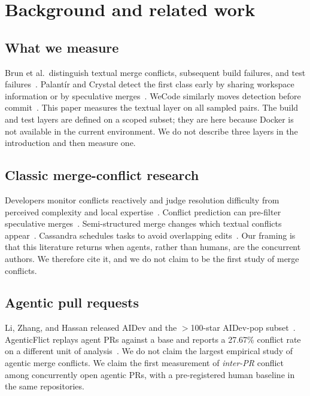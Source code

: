 \documentclass[10pt,conference]{IEEEtran}
\begin{document}
\section{Background and related work}
\label{sec:related}

\subsection{What we measure}
Brun et al.\ distinguish textual merge conflicts, subsequent build failures, and test failures~\cite{brun2013crystal}. Palant\'ir and Crystal detect the first class early by sharing workspace information or by speculative merges~\cite{sarma2003palantir,sarma2012palantir,brun2011proactive,brun2010speculative}. WeCode similarly moves detection before commit~\cite{guimaraes2012wecode}. This paper measures the textual layer on all sampled pairs. The build and test layers are defined on a scoped subset; they are \WPFiveStatus{} here because Docker is not available in the current environment. We do not describe three layers in the introduction and then measure one.

\subsection{Classic merge-conflict research}
Developers monitor conflicts reactively and judge resolution difficulty from perceived complexity and local expertise~\cite{nelson2019lifecycle,mckee2017perspectives}. Conflict prediction can pre-filter speculative merges~\cite{owhadi2019predicting}. Semi-structured merge changes which textual conflicts appear~\cite{apel2011semistructured,accioly2018semistructured,cavalcanti2017semistructured}. Cassandra schedules tasks to avoid overlapping edits~\cite{kasi2013cassandra}. Our framing is that this literature returns when agents, rather than humans, are the concurrent authors. We therefore cite it, and we do not claim to be the first study of merge conflicts.

\subsection{Agentic pull requests}
Li, Zhang, and Hassan released AIDev and the $>$100-star AIDev-pop subset~\cite{li2025aidev,li2026aidevpop}. AgenticFlict replays agent PRs against a base and reports a 27.67\% conflict rate on a different unit of analysis~\cite{ogenrwot2026agenticflict}. We do not claim the largest empirical study of agentic merge conflicts. We claim the first measurement of \emph{inter-PR} conflict among concurrently open agentic PRs, with a pre-registered human baseline in the same repositories.
\end{document}
